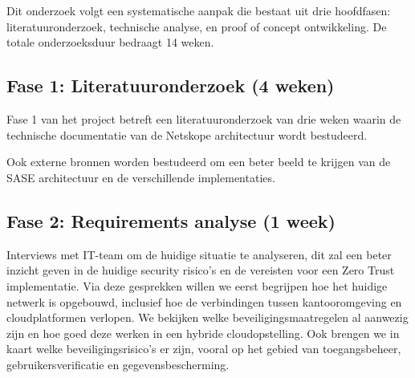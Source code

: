 
\chapter{}%
\label{ch:methodologie}


Dit onderzoek volgt een systematische aanpak die bestaat uit drie hoofdfasen: literatuuronderzoek, technische analyse, en proof of concept ontwikkeling. De totale onderzoeksduur bedraagt 14 weken.

\section{Fase 1: Literatuuronderzoek (4 weken)}
Fase 1 van het project betreft een literatuuronderzoek van drie weken waarin de technische documentatie van de Netskope architectuur wordt bestudeerd. 

\vspace{2ex}

Ook externe bronnen worden bestudeerd om een beter beeld te krijgen van de SASE architectuur en de verschillende implementaties.

\section{Fase 2: Requirements analyse (1 week)}
Interviews met IT-team om de huidige situatie te analyseren, dit zal een beter inzicht geven in de huidige security risico's en de vereisten voor een Zero Trust implementatie. 
Via deze gesprekken willen we eerst begrijpen hoe het huidige netwerk is opgebouwd, inclusief hoe de verbindingen tussen kantooromgeving en cloudplatformen verlopen. We bekijken welke beveiligingsmaatregelen al aanwezig zijn en hoe goed deze werken in een hybride cloudopstelling. Ook brengen we in kaart welke beveiligingsrisico’s er zijn, vooral op het gebied van toegangsbeheer, gebruikersverificatie en gegevensbescherming.

